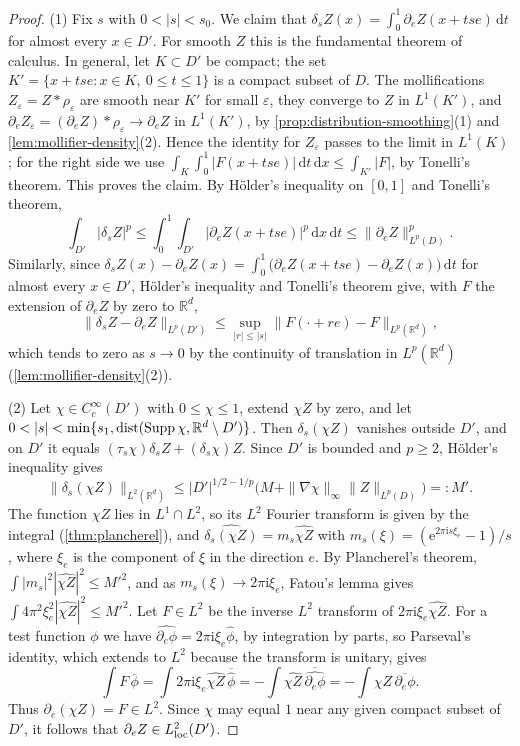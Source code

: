 \begin{proof}
(1) Fix $s$ with $0<|s|<s_0$. We claim that $\delta_sZ(x)=\int_0^1\partial_eZ(x+tse)\,\mathrm dt$ for almost every $x\in D'$. For smooth $Z$ this is the fundamental theorem of calculus. In general, let $K\subset D'$ be compact; the set $K'=\{x+tse:x\in K,\ 0\leq t\leq1\}$ is a compact subset of $D$. The mollifications $Z_\varepsilon=Z*\rho_\varepsilon$ are smooth near $K'$ for small $\varepsilon$, they converge to $Z$ in $L^1(K')$, and $\partial_eZ_\varepsilon=(\partial_eZ)*\rho_\varepsilon\to\partial_eZ$ in $L^1(K')$, by \cref{prop:distribution-smoothing}(1) and \cref{lem:mollifier-density}(2). Hence the identity for $Z_\varepsilon$ passes to the limit in $L^1(K)$; for the right side we use $\int_K\int_0^1|F(x+tse)|\,\mathrm dt\,\mathrm dx\leq\int_{K'}|F|$, by Tonelli's theorem. This proves the claim. By H\"older's inequality on $[0,1]$ and Tonelli's theorem,
\[
 \int_{D'}|\delta_sZ|^p\leq\int_0^1\int_{D'}|\partial_eZ(x+tse)|^p\,\mathrm dx\,\mathrm dt\leq\|\partial_eZ\|_{L^p(D)}^p.
\]
Similarly, since $\delta_sZ(x)-\partial_eZ(x)=\int_0^1\bigl(\partial_eZ(x+tse)-\partial_eZ(x)\bigr)\,\mathrm dt$ for almost every $x\in D'$, H\"older's inequality and Tonelli's theorem give, with $F$ the extension of $\partial_eZ$ by zero to $\mathbb R^d$,
\[
 \|\delta_sZ-\partial_eZ\|_{L^p(D')}\leq\sup_{|r|\leq|s|}\|F(\cdot+re)-F\|_{L^p(\mathbb R^d)},
\]
which tends to zero as $s\to0$ by the continuity of translation in $L^p(\mathbb R^d)$ (\cref{lem:mollifier-density}(2)).

(2) Let $\chi\in C_c^\infty(D')$ with $0\leq\chi\leq1$, extend $\chi Z$ by zero, and let $0<|s|<\min\{s_1,\operatorname{dist}(\Supp\chi,\mathbb R^d\setminus D')\}$. Then $\delta_s(\chi Z)$ vanishes outside $D'$, and on $D'$ it equals $(\tau_s\chi)\delta_sZ+(\delta_s\chi)Z$. Since $D'$ is bounded and $p\geq2$, H\"older's inequality gives
\[
 \|\delta_s(\chi Z)\|_{L^2(\mathbb R^d)}\leq|D'|^{1/2-1/p}\bigl(M+\|\nabla\chi\|_\infty\|Z\|_{L^p(D)}\bigr)=:M'.
\]
The function $\chi Z$ lies in $L^1\cap L^2$, so its $L^2$ Fourier transform is given by the integral (\cref{thm:plancherel}), and $\widehat{\delta_s(\chi Z)}=m_s\widehat{\chi Z}$ with $m_s(\xi)=(\mathrm e^{2\pi\mathrm is\xi_e}-1)/s$, where $\xi_e$ is the component of $\xi$ in the direction $e$. By Plancherel's theorem, $\int|m_s|^2|\widehat{\chi Z}|^2\leq M'^2$, and as $m_s(\xi)\to2\pi\mathrm i\xi_e$, Fatou's lemma gives $\int4\pi^2\xi_e^2|\widehat{\chi Z}|^2\leq M'^2$. Let $F\in L^2$ be the inverse $L^2$ transform of $2\pi\mathrm i\xi_e\widehat{\chi Z}$. For a test function $\phi$ we have $\widehat{\partial_e\phi}=2\pi\mathrm i\xi_e\widehat\phi$, by integration by parts, so Parseval's identity, which extends to $L^2$ because the transform is unitary, gives
\[
 \int F\,\overline\phi=\int2\pi\mathrm i\xi_e\widehat{\chi Z}\,\overline{\widehat\phi}=-\int\widehat{\chi Z}\,\overline{\widehat{\partial_e\phi}}=-\int\chi Z\,\overline{\partial_e\phi}.
\]
Thus $\partial_e(\chi Z)=F\in L^2$. Since $\chi$ may equal $1$ near any given compact subset of $D'$, it follows that $\partial_eZ\in L^2_{\mathrm{loc}}(D')$.


\end{proof}
